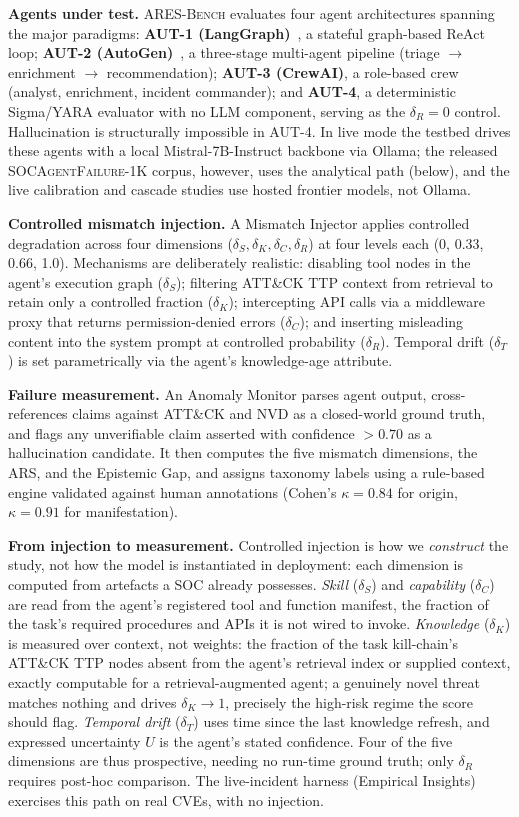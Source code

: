 \documentclass[journal,compsoc]{IEEEtran}
\newcommand{\ARESBench}{\textsc{ARES-Bench}}
\newcommand{\SAFK}{\textsc{SOCAgentFailure-1K}}
\begin{document}
\textbf{Agents under test.} \ARESBench{} evaluates four agent
architectures spanning the major paradigms: \textbf{AUT-1
(LangGraph)}~\cite{langgraph2024}, a stateful graph-based ReAct loop;
\textbf{AUT-2 (AutoGen)}~\cite{wu2023autogen}, a three-stage
multi-agent pipeline (triage $\to$ enrichment $\to$ recommendation);
\textbf{AUT-3 (CrewAI)}, a role-based crew (analyst, enrichment,
incident commander); and \textbf{AUT-4}, a deterministic Sigma/YARA
evaluator with no LLM component, serving as the $\delta_R = 0$
control. Hallucination is structurally impossible in AUT-4. In live mode the
testbed drives these agents with a local Mistral-7B-Instruct backbone
via Ollama; the released \SAFK{} corpus, however, uses the analytical
path (below), and the live calibration and cascade studies use hosted
frontier models, not Ollama.

\textbf{Controlled mismatch injection.} A Mismatch Injector applies
controlled degradation across four dimensions ($\delta_S, \delta_K,
\delta_C, \delta_R$) at four levels each (0, 0.33, 0.66, 1.0).
Mechanisms are deliberately realistic: disabling tool nodes in the
agent's execution graph ($\delta_S$); filtering ATT\&CK TTP context
from retrieval to retain only a controlled fraction ($\delta_K$);
intercepting API calls via a middleware proxy that returns
permission-denied errors ($\delta_C$); and inserting misleading content
into the system prompt at controlled probability ($\delta_R$).
Temporal drift ($\delta_T$) is set parametrically via the agent's
knowledge-age attribute.

\textbf{Failure measurement.} An Anomaly Monitor parses agent
output, cross-references claims against ATT\&CK and NVD as a
closed-world ground truth, and flags any unverifiable claim asserted
with confidence $> 0.70$ as a hallucination candidate. It then
computes the five mismatch dimensions, the ARS, and the Epistemic Gap,
and assigns taxonomy labels using a rule-based engine validated
against human annotations (Cohen's $\kappa = 0.84$ for origin,
$\kappa = 0.91$ for manifestation).

\textbf{From injection to measurement.} Controlled injection is how we
\textit{construct} the study, not how the model is instantiated in
deployment: each dimension is computed from artefacts a SOC already
possesses. \textit{Skill} ($\delta_S$) and \textit{capability}
($\delta_C$) are read from the agent's registered tool and function
manifest, the fraction of the task's required procedures and APIs it is
not wired to invoke. \textit{Knowledge} ($\delta_K$) is measured over
context, not weights: the fraction of the task kill-chain's ATT\&CK TTP
nodes absent from the agent's retrieval index or supplied context,
exactly computable for a retrieval-augmented agent; a genuinely novel
threat matches nothing and drives $\delta_K \to 1$, precisely the
high-risk regime the score should flag. \textit{Temporal drift}
($\delta_T$) uses time since the last knowledge refresh, and expressed
uncertainty $U$ is the agent's stated confidence. Four of the five
dimensions are thus prospective, needing no run-time ground truth; only
$\delta_R$ requires post-hoc comparison. The live-incident harness
(Empirical Insights) exercises this path on real CVEs, with no
injection.
\end{document}
